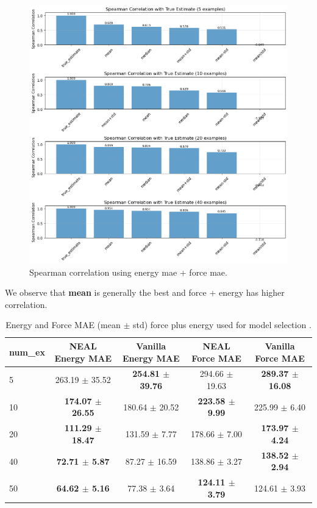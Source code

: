 \documentclass[12pt]{article}
\theoremstyle{definition}
\theoremstyle{remark}
\begin{document}
\begin{figure}[htbp]
    \centering
    \includegraphics[width=0.75\linewidth]{plots/Spearman coreelation using force + energy use all seeds.png}
    \caption{Spearman correlation using energy mae + force mae.}
    \label{fig:placeholder}
\end{figure}
We observe that \textbf{mean} is generally the best and force + energy has higher correlation.
\begin{table}[htbp]
\centering
\small
\caption{Energy and Force MAE (mean $\pm$ std) force plus energy used for model selection .}
\begin{tabular}{@{}lcccc@{}}
\hline
\textbf{num\_ex} & \textbf{NEAL Energy MAE} & \textbf{Vanilla Energy MAE} & \textbf{NEAL Force MAE} & \textbf{Vanilla Force MAE} \\
\hline
5  & 263.19 $\pm$ 35.52 & \textbf{254.81 $\pm$ 39.76} & 294.66 $\pm$ 19.63 & \textbf{289.37 $\pm$ 16.08} \\
10 & \textbf{174.07 $\pm$ 26.55} & 180.64 $\pm$ 20.52 & \textbf{223.58 $\pm$ 9.99} & 225.99 $\pm$ 6.40 \\
20 & \textbf{111.29 $\pm$ 18.47} & 131.59 $\pm$ 7.77  & 178.66 $\pm$ 7.00  & \textbf{173.97 $\pm$ 4.24} \\
40 & \textbf{72.71 $\pm$ 5.87}   & 87.27 $\pm$ 16.59  & 138.86 $\pm$ 3.27  & \textbf{138.52 $\pm$ 2.94} \\
50 & \textbf{64.62 $\pm$ 5.16} & 77.38 $\pm$ 3.64     & \textbf{124.11 $\pm$ 3.79} & 124.61 $\pm$ 3.93
\\
\hline
\end{tabular}
\end{table}
\end{document}
